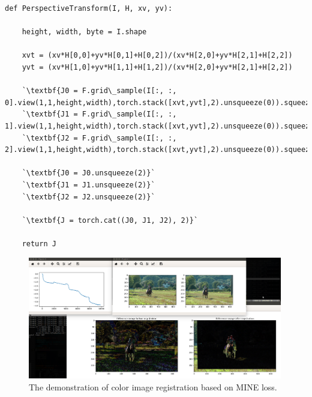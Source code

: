 \documentclass[UTF8]{article}
\begin{document}
\begin{lstlisting}
def PerspectiveTransform(I, H, xv, yv):

    height, width, byte = I.shape

    xvt = (xv*H[0,0]+yv*H[0,1]+H[0,2])/(xv*H[2,0]+yv*H[2,1]+H[2,2])
    yvt = (xv*H[1,0]+yv*H[1,1]+H[1,2])/(xv*H[2,0]+yv*H[2,1]+H[2,2])

    `\textbf{J0 = F.grid\_sample(I[:, :, 0].view(1,1,height,width),torch.stack([xvt,yvt],2).unsqueeze(0)).squeeze()}`
    `\textbf{J1 = F.grid\_sample(I[:, :, 1].view(1,1,height,width),torch.stack([xvt,yvt],2).unsqueeze(0)).squeeze()}`
    `\textbf{J2 = F.grid\_sample(I[:, :, 2].view(1,1,height,width),torch.stack([xvt,yvt],2).unsqueeze(0)).squeeze()}`

    `\textbf{J0 = J0.unsqueeze(2)}`
    `\textbf{J1 = J1.unsqueeze(2)}`
    `\textbf{J2 = J2.unsqueeze(2)}`

    `\textbf{J = torch.cat((J0, J1, J2), 2)}`

    return J
\end{lstlisting}

\begin{figure}[htbp]	%
\centering
\includegraphics[width=0.99\textwidth]{figure/registration_color.png}
    \caption{The demonstration of color image registration based on MINE loss.}
\label{fig_bay}
\end{figure}


\newpage
\end{document}
